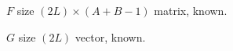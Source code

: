 \documentclass[7pt,a4paper]{scrartcl}
\begin{document}
\begin{multicols*}{4}
{$F$ size $(2L)\times(A+B-1)$ matrix, known.

$G$ size $(2L)$ vector, known.
}

























\end{multicols*}
\end{document}
